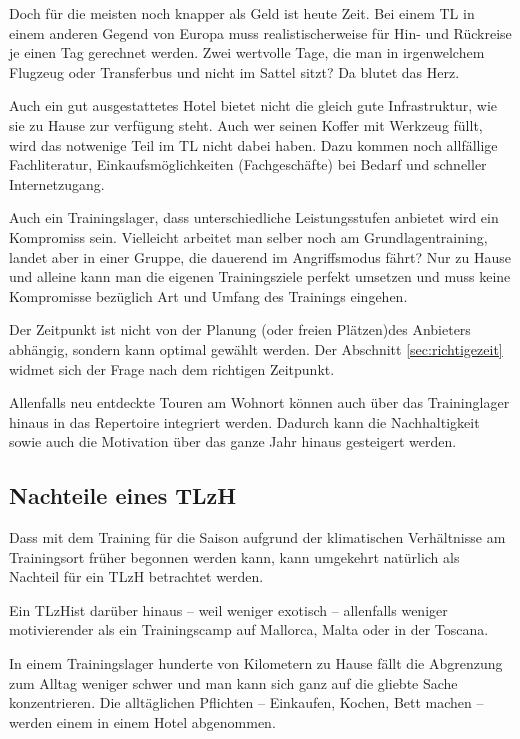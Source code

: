 \documentclass[a4paper,DIV13,BCOR0cm,draft=TRUE]{scrartcl}
\newcommand{\tlzh}{TLzH}
\begin{document}

Doch für die meisten noch knapper als Geld ist heute Zeit.
Bei einem TL in einem anderen Gegend von Europa muss realistischerweise für Hin- und Rückreise je einen Tag gerechnet werden.
Zwei wertvolle Tage, die man in irgenwelchem Flugzeug oder Transferbus und nicht im Sattel sitzt?
Da blutet das Herz.

Auch ein gut ausgestattetes Hotel bietet nicht die gleich gute Infrastruktur, wie sie zu Hause zur verfügung steht.
Auch wer seinen Koffer mit Werkzeug füllt, wird das notwenige Teil im TL nicht dabei haben.
Dazu kommen noch allfällige Fachliteratur, Einkaufsmöglichkeiten (Fachgeschäfte) bei Bedarf und schneller Internetzugang.

Auch ein Trainingslager, dass unterschiedliche Leistungsstufen anbietet wird ein Kompromiss sein.
Vielleicht arbeitet man selber noch am Grundlagentraining, landet aber in einer Gruppe, die dauerend im Angriffsmodus fährt?
Nur zu Hause und alleine kann man die eigenen Trainingsziele perfekt umsetzen und muss keine Kompromisse bezüglich Art und Umfang des Trainings eingehen.

Der Zeitpunkt ist nicht von der Planung (oder freien Plätzen)des Anbieters abhängig, sondern kann optimal gewählt werden.
Der Abschnitt \ref{sec:richtigezeit} widmet sich der Frage nach dem richtigen Zeitpunkt.

Allenfalls neu entdeckte Touren am Wohnort können auch über das Traininglager hinaus in das Repertoire integriert werden.
Dadurch kann die Nachhaltigkeit sowie auch die Motivation über das ganze Jahr hinaus gesteigert werden.

\subsection{Nachteile eines \tlzh}

Dass mit dem Training für die Saison aufgrund der klimatischen Verhältnisse am Trainingsort früher begonnen werden kann,
kann umgekehrt natürlich als Nachteil für ein \tlzh{} betrachtet werden.

Ein \tlzh ist darüber hinaus -- weil weniger exotisch -- allenfalls weniger motivierender als ein Trainingscamp auf Mallorca, Malta oder in der Toscana.

In einem Trainingslager hunderte von Kilometern zu Hause fällt die Abgrenzung zum Alltag weniger schwer und
man kann sich ganz auf die gliebte Sache konzentrieren.
Die alltäglichen Pflichten -- Einkaufen, Kochen, Bett machen -- werden einem in einem Hotel abgenommen.
\end{document}
